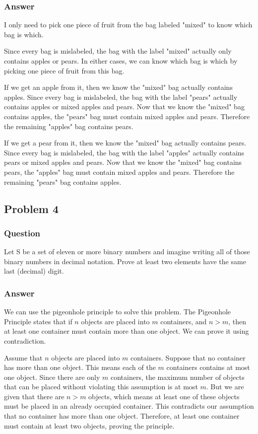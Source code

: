 \documentclass{article}
\begin{document}
\subsubsection{Answer} I only need to pick one piece of fruit from the bag labeled "mixed" to know which bag is which.

Since every bag is mislabeled, the bag with the label "mixed" actually only contains apples or pears. In either cases, we can know which bag is which by picking one piece of fruit from this bag.

If we get an apple from it, then we know the "mixed" bag actually contains apples. Since every bag is mislabeled, the bag with the label "pears" actually contains apples or mixed apples and pears. Now that we know the "mixed" bag contains apples, the "pears" bag must contain mixed apples and pears. Therefore the remaining "apples" bag contains pears.

If we get a pear from it, then we know the "mixed" bag actually contains pears. Since every bag is mislabeled, the bag with the label "apples" actually contains pears or mixed apples and pears. Now that we know the "mixed" bag contains pears, the "apples" bag must contain mixed apples and pears. Therefore the remaining "pears" bag contains apples.

\subsection{Problem 4} 
\subsubsection{Question} Let S be a set of eleven or more binary numbers and imagine writing all of those binary numbers in decimal notation. Prove at least two elements have the same last (decimal) digit. 

\subsubsection{Answer} We can use the pigeonhole principle to solve this problem. The Pigeonhole Principle states that if \(n\) objects are placed into \(m\) containers, and \(n > m\), then at least one container must contain more than one object. We can prove it using contradiction.

Assume that \(n\) objects are placed into \(m\) containers. Suppose that no container has more than one object. This means each of the \(m\) containers contains at most one object. Since there are only \(m\) containers, the maximum number of objects that can be placed without violating this assumption is at most \(m\). But we are given that there are \(n > m\) objects, which means at least one of these objects must be placed in an already occupied container. This contradicts our assumption that no container has more than one object. Therefore, at least one container must contain at least two objects, proving the principle.
\end{document}
